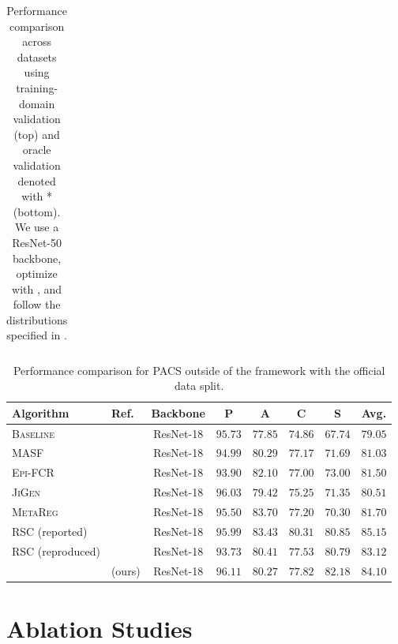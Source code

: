 \begin{table}[t]
\begin{tabular}{llcccccc}
\bottomrule
\end{tabular}
\caption[Performance comparison across datasets]{Performance comparison across datasets using training-domain validation (top) and  oracle validation denoted with * (bottom). We use a ResNet-50 backbone, optimize with \adam, and follow the distributions specified in \domainbed.}
\label{tab:perfom}
\end{table}

\begin{table}
\small
\centering
\begin{tabular}{llcccccc}
\toprule
\textbf{Algorithm} & \textbf{Ref.} & \textbf{Backbone} & \textbf{P} & \textbf{A} & \textbf{C} & \textbf{S} &  \textbf{Avg.} \\
\midrule
\textsc{Baseline}		&\cite{CarlucciDBCT19}				&	ResNet-18	&	$95.73$		&	$77.85$		&	$74.86$		&	$67.74$		&	$79.05$		 \\
\textsc{MASF}		&\cite{DouCKG19}					&	ResNet-18	&	$94.99$		&	$80.29$		&	$77.17$		&	$71.69$		&	$81.03$		 \\
\textsc{Epi-FCR}		&\cite{LiZYLSH19}					&	ResNet-18	&	$93.90$		&	$82.10$		&	$77.00$		&	$73.00$		&	$81.50$		 \\
\textsc{JiGen}		&\cite{CarlucciDBCT19}				&	ResNet-18	&	$96.03$		&	$79.42$		&	$75.25$		&	$71.35$		&	$80.51$		\\
\textsc{MetaReg}		& \cite{BalajiSC18}					&	ResNet-18	&	$95.50$		&	$83.70$		&	$77.20$		&	$70.30$		&	$81.70$		\\
\textsc{RSC} (reported)	& \cite{huang2020selfchallenging}		&	ResNet-18	&	$95.99$		&	$83.43$		&	$80.31$		&	$80.85$		&	$85.15$		\\
\textsc{RSC} (reproduced) & \cite{huang2020selfchallenging}		&	ResNet-18	&	$93.73$		&	$80.41$		&	$77.53$		&	$80.79$		&	$83.12$		\\
\divcams			&     (ours)						&	ResNet-18	&	$96.11$		&	$80.27$		&	$77.82$		&	$82.18$		&	$84.10$		\\
\bottomrule
\end{tabular}
\caption[Performance comparison for official PACS splits outside of \domainbed]{Performance comparison for PACS outside of the \domainbed framework with the official data split.}
\label{tab:official}
\end{table}



\section{Ablation Studies}

